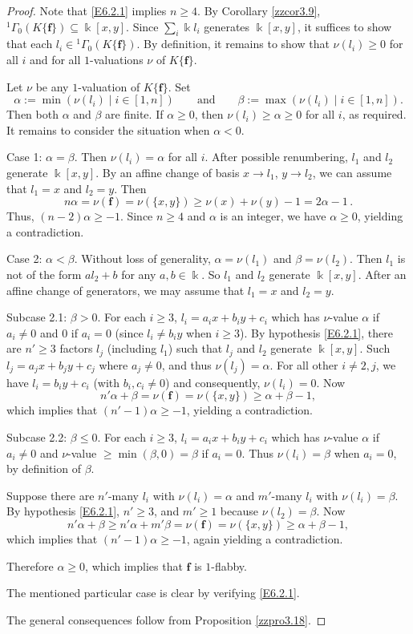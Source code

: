 \documentclass[12pt]{amsart}
\theoremstyle{plain}
\numberwithin{theorem}{section}
\numberwithin{equation}{theorem}
\theoremstyle{definition}
\newcommand \bff {{\mathbf{f}}}
\begin{document}
\begin{proof} 
Note that \eqref{E6.2.1} implies $n \ge 4$.
By Corollary \ref{zzcor3.9}, 
${^1\Gamma}_{0}(K\{\bff\})\subseteq \Bbbk[x,y]$. Since
$\sum_i \Bbbk l_i$ generates $\Bbbk[x,y]$, it suffices to show
that each $l_i\in {^1\Gamma}_{0}(K\{\bff\})$. By definition,
it remains to show that $\nu(l_i)\geq 0$ for all $i$ and 
for all $1$-valuations $\nu$ of $K\{\bff\}$. 


Let $\nu$ be any $1$-valuation of $K\{\bff\}$. Set 
$$
\alpha :=\min( \nu(l_i)\mid i \in [1,n] ) \qquad\text{and}\qquad 
\beta :=\max( \nu(l_i)\mid i \in [1,n] ).
$$
Then 
both $\alpha$ and $\beta$ are finite. If $\alpha\geq 0$,
then $\nu(l_i)\geq \alpha\geq 0$ for all $i$, as required. 
It remains to consider the situation when $\alpha<0$. 

Case 1: $\alpha=\beta$. Then $\nu(l_i)=\alpha$ for all
$i$. After possible renumbering, $l_1$ and $l_2$ generate $\Bbbk[x,y]$. By an affine change of basis
$x\to l_1$, $y\to l_2$, we can assume that 
$l_1=x$ and $l_2=y$. Then 
$$
n \alpha =\nu(\bff)=\nu(\{x,y\})
\geq \nu(x)+\nu(y)-1 = 2\alpha -1 \,.
$$
Thus, $(n-2)\alpha \geq -1$.
Since $n \ge 4$ and $\alpha$ is an integer, we have
$\alpha\geq 0$, yielding a contradiction.

Case 2: $\alpha<\beta$. 
Without loss of generality, $\alpha=\nu(l_1)$
and $\beta=\nu(l_2)$. Then $l_1$ is not of the form
$al_2+b$ for any $a,b\in \Bbbk$. So $l_1$ and $l_2$
generate $\Bbbk[x,y]$. After an affine change of generators, we may assume that $l_1=x$ and $l_2=y$.

Subcase 2.1: $\beta > 0$.
For each $i\geq 3$, $l_i=a_i x+b_i y+c_i$ which 
has $\nu$-value $\alpha$ if $a_i\neq 0$ and $0$
if $a_i=0$ (since $l_i \ne b_i y$ when $i \ge 3$). By hypothesis \eqref{E6.2.1}, there are $n'\geq 3$
factors $l_j$ (including $l_1$) such that $l_j$ and $l_2$
generate $\Bbbk[x,y]$. Such $l_j= a_j x+b_j y+c_j$ where $a_j\neq 0$, and thus $\nu(l_j)=\alpha$. For all other $i\neq 2, j$, we have $l_i=b_i y+c_i$ 
(with $b_i,c_i\neq 0$) and consequently, $\nu(l_i)= 0$.  Now
$$n' \alpha + \beta =\nu(\bff)=\nu(\{x,y\})\geq \alpha+\beta-1,$$
which implies that $(n'-1)\alpha \geq -1$, yielding a contradiction.

Subcase 2.2: $\beta \le 0$.
For each $i\geq 3$, $l_i=a_i x+b_i y+c_i$ which 
has $\nu$-value $\alpha$ if $a_i\neq 0$ and $\nu$-value $\ge \min(\beta,0)=\beta$
if $a_i=0$. Thus $\nu(l_i) = \beta$ when $a_i=0$, by definition of $\beta$.

Suppose there are $n'$-many
$l_i$ with $\nu(l_i)=\alpha$ and $m'$-many $l_i$ with $\nu(l_i)=\beta$.
By hypothesis \eqref{E6.2.1}, $n'\geq 3$, and $m' \ge 1$ because $\nu(l_2) = \beta$. Now
$$n'\alpha + \beta \ge n'\alpha + m' \beta =\nu(\bff)=\nu(\{x,y\})\geq \alpha+\beta-1,$$
which implies that $(n'-1) \alpha\geq -1$, again yielding a contradiction.

 Therefore
$\alpha\geq 0$, which implies that $\bff$ is $1$-flabby.

The mentioned particular case is clear by verifying \eqref{E6.2.1}.

The general consequences follow from Proposition \ref{zzpro3.18}.
\end{proof}
\end{document}

